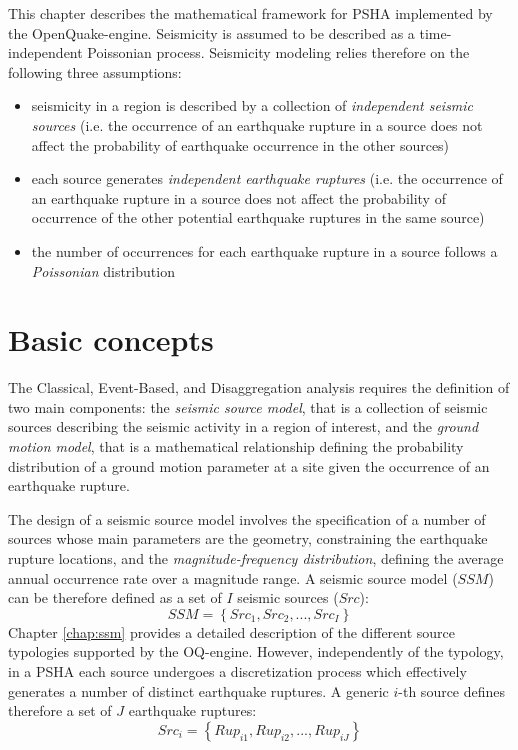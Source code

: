 This chapter describes the mathematical framework for PSHA implemented by the
OpenQuake-engine.  Seismicity is assumed to be described as a time-independent
Poissonian process. Seismicity modeling relies therefore on the following three
assumptions:
\begin{itemize}
    \item seismicity in a region is described by a collection of
        \textit{independent seismic sources} (i.e. the occurrence of an
        earthquake rupture in a source does not affect the probability of
        earthquake occurrence in the other sources)
    \item each source generates \textit{independent earthquake ruptures} (i.e.
        the occurrence of an earthquake rupture in a source does not affect the
        probability of occurrence of the other potential earthquake ruptures in
        the same source)
    \item the number of occurrences for each earthquake rupture in a source
        follows a \textit{Poissonian} distribution
\end{itemize}

\section{Basic concepts}
The Classical, Event-Based, and Disaggregation analysis requires the definition
of two main components: the \textit{seismic source model}, that is a collection
of seismic sources describing the seismic activity in a region of interest, and
the \textit{ground motion model}, that is a mathematical relationship defining
the probability distribution of a ground motion parameter at a site given the
occurrence of an earthquake rupture.

The design of a seismic source model involves the specification of a number of
sources whose main parameters are the geometry, constraining the earthquake
rupture locations, and the \textit{magnitude-frequency distribution}, defining
the average annual occurrence rate over a magnitude range. A seismic source
model ($SSM$) can be therefore defined as a set of $I$ seismic sources
($Src$):
\begin{equation}
SSM = \left\{Src_{1}, Src_{2}, ..., Src_{I}\right\}
\end{equation}
Chapter \ref{chap:ssm} provides a detailed description of the different source
typologies supported by the OQ-engine. However, independently of the typology,
in a PSHA each source undergoes a discretization process which effectively
generates a number of distinct earthquake ruptures. A generic $i$-th source
defines therefore a set of $J$ earthquake ruptures:
\begin{equation}
Src_{i} = \left\{Rup_{i1}, Rup_{i2}, ..., Rup_{iJ}\right\}
\end{equation}

